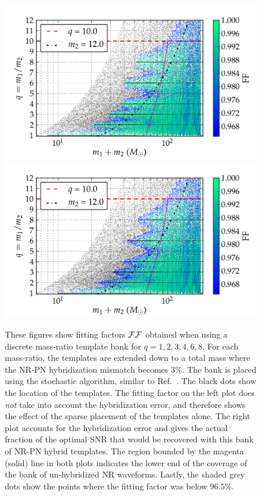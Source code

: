 \begin{figure}
\begin{center}
\includegraphics[width=\columnwidth]{figures/nrhybbank/bank001_lowM_01_stochastic_mtot200_logMq_NOhybMM-tiny.png}
\includegraphics[width=\columnwidth]{figures/nrhybbank/bank001_lowM_01_stochastic_mtot200_logMq_hybMM-tiny.png}
\caption{\label{fig:Current-hybrids-stochastic-FF}These figures show fitting
  factors $\mathcal{FF}$ obtained when using a discrete mass-ratio template bank for
  $q=1,2,3,4,6,8$. For each mass-ratio, the templates are extended down 
  to a total mass where the NR-PN hybridization mismatch becomes
  $3\%$. The bank is placed using the stochastic algorithm, similar to 
  Ref.~\cite{Harry:2009ea,Ajith:2012mn,Manca:2009xw}. 
  The black dots show the location
  of the templates. The fitting factor on the left plot does 
  {\em not} take into account the hybridization error, and therefore shows the
  effect of the sparse placement of the templates alone. 
  The right plot accounts for the hybridization error
  and gives the actual fraction of the optimal SNR that would be recovered
  with this bank of NR-PN hybrid templates. The region bounded by the magenta 
  (solid) line in both plots indicates the lower end of the coverage of the 
  bank of un-hybridized NR waveforms. Lastly, the shaded grey dots show the 
  points where the fitting factor was below $96.5\%$.}
\end{center}
\end{figure}
